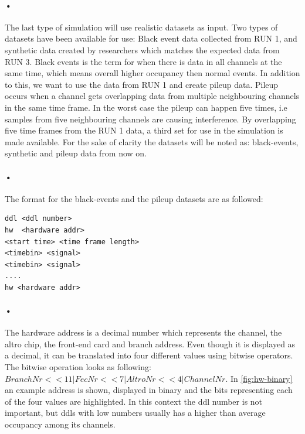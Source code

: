 \documentclass[a4paper, 12pt]{report}\dfrac{\right }{•}
\begin{document}
\paragraph{•}
The last type of simulation will use realistic datasets as input. 
Two types of datasets have been available for use: Black event data collected from RUN 1, and synthetic data created by researchers which matches the expected data from RUN 3.
Black events is the term for when there is data in all channels at the same time, which means overall higher occupancy then normal events.
In addition to this, we want to use the data from RUN 1 and create pileup data.
Pileup occurs when a channel gets overlapping data from multiple neighbouring channels in the same time frame.
In the worst case the pileup can happen five times, i.e samples from five neighbouring channels are causing interference.
By overlapping five time frames from the RUN 1 data, a third set for use in the simulation is made available.
For the sake of clarity the datasets will be noted as: black-events, synthetic and pileup data from now on.
 
\paragraph{•} 
The format for the black-events and the pileup datasets are as followed:
\begin{minipage}{\linewidth}
\begin{lstlisting}[caption=Format for the black-event and pileup dataset., label=lst:black-event-format]
ddl <ddl number>
hw  <hardware addr>
<start time> <time frame length>
<timebin> <signal>
<timebin> <signal>
....
hw <hardware addr>
\end{lstlisting}
\end{minipage}

\paragraph{•}
The hardware address is a decimal number which represents the channel, the \gls{altro} chip, the front-end card and branch address.
Even though it is displayed as a decimal, it can be translated into four different values using bitwise operators.
The bitwise operation looks as following: $BranchNr << 11 | FecNr << 7 | AltroNr << 4 | ChannelNr $.
In \ref{fig:hw-binary} an example address is shown, displayed in binary and the bits representing each of the four values are highlighted.
In this context the ddl number is not important, but ddls with low numbers usually has a higher than average occupancy among its channels.
\end{document}
